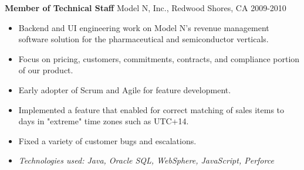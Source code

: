 \textbf{Member of Technical Staff}
Model N, Inc., Redwood Shores, CA \hfill 2009-2010
\begin{itemize} \itemsep -2pt %
\item Backend and UI engineering work on Model N's revenue management
      software solution for the pharmaceutical and semiconductor verticals.
\item Focus on pricing, customers, commitments, contracts, and compliance
      portion of our product.
\item Early adopter of Scrum and Agile for feature development.
\item Implemented a feature that enabled for correct matching of sales
      items to days in "extreme" time zones such as UTC+14.
\item Fixed a variety of customer bugs and escalations.

\item \textit{Technologies used: Java, Oracle SQL, WebSphere, JavaScript,
      Perforce}

\end{itemize}
